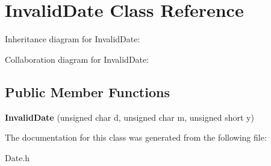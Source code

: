 \hypertarget{classInvalidDate}{}\section{Invalid\+Date Class Reference}
\label{classInvalidDate}


Inheritance diagram for Invalid\+Date\+:


Collaboration diagram for Invalid\+Date\+:
\subsection*{Public Member Functions}
\begin{DoxyCompactItemize}
\item 
\mbox{\label{classInvalidDate_a20f3fdf974ee211214ca10cd3e294b6b}} 
{\bfseries Invalid\+Date} (unsigned char d, unsigned char m, unsigned short y)
\end{DoxyCompactItemize}


The documentation for this class was generated from the following file\+:\begin{DoxyCompactItemize}
\item 
Date.\+h\end{DoxyCompactItemize}
